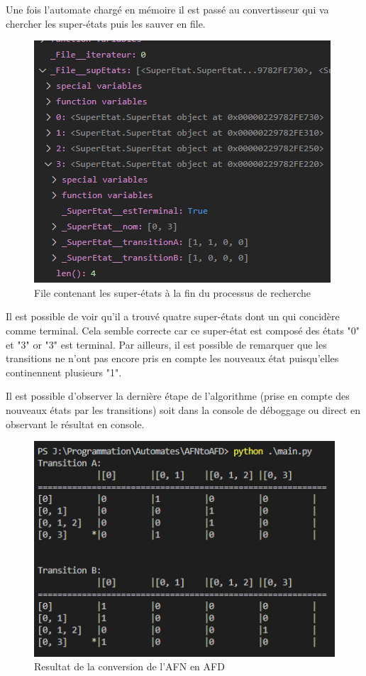 \documentclass[a4paper]{article}
\begin{document}
Une fois l'automate chargé en mémoire il est passé au convertisseur qui
va chercher les super-états puis les sauver en file.\\

\begin{figure}[!h]
	\centering
	\includegraphics[scale=0.7]{src/AFNfile.PNG}
	\caption{File contenant les super-états à la fin du processus de recherche}
\end{figure}

Il est possible de voir qu'il a trouvé quatre super-états dont un qui 
concidère comme terminal. Cela semble correcte car ce super-état est 
composé des états "0" et "3" or "3" est terminal. Par ailleurs, il est possible 
de remarquer que les transitions ne n'ont pas encore pris en compte les nouveaux
état puisqu'elles continennent plusieurs "1".

Il est possible d'observer la dernière étape de l'algorithme (prise en compte des nouveaux
états par les transitions) soit dans la console de déboggage ou direct en observant le résultat
en console.\\

\begin{figure}[!h]
	\centering
	\includegraphics[scale=0.8]{src/resultat_AFN.PNG}
	\caption{Resultat de la conversion de l'AFN en AFD}
\end{figure}
\end{document}
